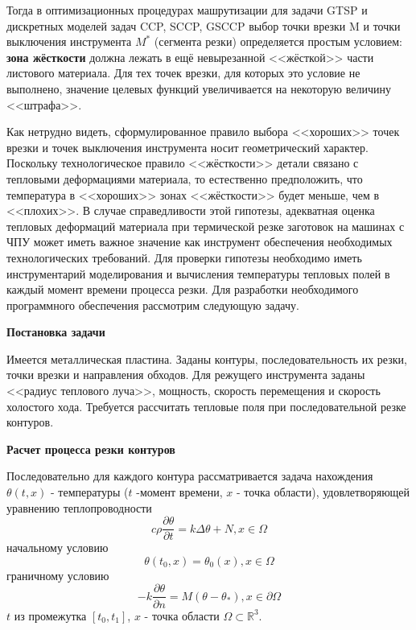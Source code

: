 \documentclass[11pt,twoside]{report}
\begin{document}
Тогда в оптимизационных процедурах машрутизации
для задачи GTSP  и дискретных моделей задач CCP, SCCP, GSCCP
выбор точки врезки M и точки выключения инструмента $M^*$
(сегмента резки) определяется простым условием:
{\bf зона жёсткости} должна лежать в ещё невырезанной
<<жёсткой>> части листового материала.
Для тех точек врезки, для которых это условие не выполнено,
значение целевых функций  увеличивается на некоторую величину <<штрафа>>.

Как нетрудно видеть,
сформулированное правило выбора <<хороших>> точек врезки
и точек выключения инструмента носит геометрический характер.
Поскольку технологическое правило <<жёсткости>> детали
связано с тепловыми деформациями материала,
то естественно предположить,
что температура в <<хороших>> зонах <<жёсткости>> будет меньше,
чем в <<плохих>>.
В случае справедливости этой гипотезы,
адекватная оценка тепловых деформаций материала
при термической резке заготовок на машинах с ЧПУ
может иметь важное значение как инструмент
обеспечения необходимых технологических требований.
Для проверки гипотезы необходимо иметь инструментарий
моделирования и вычисления температуры тепловых полей в
каждый момент времени процесса резки.
Для разработки необходимого программного
обеспечения рассмотрим следующую задачу.

{\bf Постановка задачи}

Имеется металлическая пластина.
Заданы контуры, последовательность их резки,
точки врезки и направления обходов.
Для режущего инструмента заданы <<радиус теплового луча>>,
мощность, скорость перемещения и скорость холостого хода.
Требуется рассчитать тепловые поля при
последовательной резке контуров.

{\bf Расчет процесса резки контуров}

Последовательно для каждого контура рассматривается задача нахождения
$\theta(t, x)$ - температуры
($t$ -момент времени,
$x$ - точка области), удовлетворяющей уравнению теплопроводности
\begin{equation}
c \rho \frac{\partial \theta}{\partial t}=k \Delta \theta +N, x \in \Omega
\end{equation}
начальному условию
\begin{equation}
  \theta(t_0, x)=\theta_0(x), x \in \Omega
\end{equation}
граничному условию
\begin{equation}
  -k \frac{\partial \theta}{\partial n}=M(\theta - \theta_*), x \in \partial \Omega
\end{equation}
$t$ из промежутка $[t_0, t_1]$,
$x$ - точка области
$\Omega \subset \mathbb R^3$.
\end{document}
